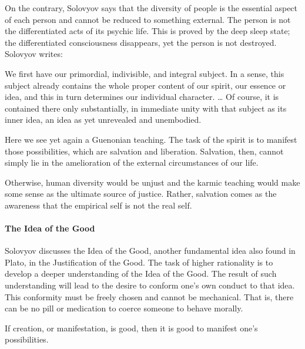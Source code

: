 On the contrary, Solovyov says that the diversity of people is the essential aspect of each person and cannot be reduced to something external. The person is not the differentiated acts of its psychic life. This is proved by the deep sleep state; the differentiated consciousness disappears, yet the person is not destroyed. Solovyov writes:

\begin{quotex}
We first have our primordial, indivisible, and integral subject. In a sense, this subject already contains the whole proper content of our spirit, our essence or idea, and this in turn determines our individual character. … Of course, it is contained there only substantially, in immediate unity with that subject as its inner idea, an idea as yet unrevealed and unembodied.

\end{quotex}
Here we see yet again a Guenonian teaching. The task of the spirit is to manifest those possibilities, which are salvation and liberation. Salvation, then, cannot simply lie in the amelioration of the external circumstances of our life.

Otherwise, human diversity would be unjust and the karmic teaching would make some sense as the ultimate source of justice. Rather, salvation comes as the awareness that the empirical self is not the real self.

\paragraph{The Idea of the Good}
Solovyov discusses the Idea of the Good, another fundamental idea also found in Plato, in the Justification of the Good. The task of higher rationality is to develop a deeper understanding of the Idea of the Good. The result of such understanding will lead to the desire to conform one's own conduct to that idea. This conformity must be freely chosen and cannot be mechanical. That is, there can be no pill or medication to coerce someone to behave morally.

If creation, or manifestation, is good, then it is good to manifest one's possibilities.



